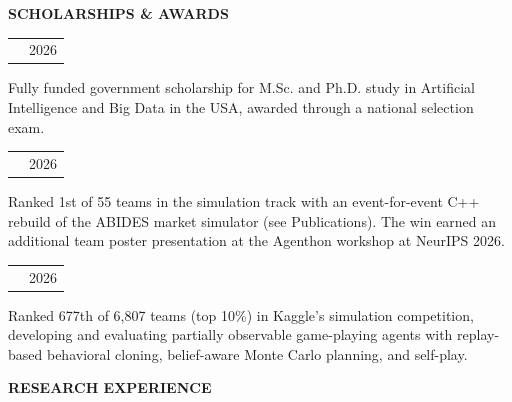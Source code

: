 \documentclass[11pt,a4paper]{article}
\makeatletter
\newcommand{\cvul}{\bgroup\markoverwith{\textcolor{muted!45}{\rule[-0.45ex]{2pt}{0.35pt}}}\ULon}
\newcommand{\hlink}[2]{\href{#1}{\cvul{#2}}}
\newcommand{\cvsection}[3][5]{%
  \par\Needspace*{#1\baselineskip}\vspace{6pt}%
  {\bfseries\fontsize{11}{13}\selectfont #3}\par\nobreak
  \vspace{3pt}{\color{muted}\hrule height 0.4pt}\nobreak\vspace{6pt}%
}
\newcommand{\cvheading}[2]{%
  \begin{tabularx}{\linewidth}{@{}>{\raggedright\arraybackslash}X@{\hspace{10pt}}r@{}}%
  \textbf{#1} & {\small\color{muted}#2}\\
  \end{tabularx}\par\nobreak
}
\newcommand{\cvbody}[1]{{\small\raggedright #1\par}}
\makeatother
\begin{document}
\cvsection{}{SCHOLARSHIPS \& AWARDS}
\begin{minipage}{\linewidth}\raggedright
\cvheading{\small{}1416 YLSY Scholarship · \hlink{https://rusen.ai/Sponsorship-MSc-PhD.pdf}{M.Sc. \& Ph.D.}}{2026}\vspace{2pt}
\cvbody{Fully funded government scholarship for M.Sc. and Ph.D. study in Artificial Intelligence and Big Data in the USA, awarded through a national selection exam.}
\end{minipage}\par\vspace{3pt}
\begin{minipage}{\linewidth}\raggedright
\cvheading{\small{}\hlink{https://www.agenthon.net/}{1st Place · Agenthon 2026, Track 3 (Simulation)}}{2026}\vspace{2pt}
\cvbody{Ranked 1st of 55 teams in the simulation track with an event-for-event C++ rebuild of the ABIDES market simulator (see Publications). The win earned an additional team poster presentation at the Agenthon workshop at NeurIPS 2026.}
\end{minipage}\par\vspace{3pt}
\begin{minipage}{\linewidth}\raggedright
\cvheading{\small{}\hlink{https://www.kaggle.com/certification/competitions/rusenbirben/pokemon-tcg-ai-battle}{Kaggle Bronze Medal · The Pokémon Company PTCG AI Battle Challenge}}{2026}\vspace{2pt}
\cvbody{Ranked 677th of 6,807 teams (top 10\%) in Kaggle’s simulation competition, developing and evaluating partially observable game-playing agents with replay-based behavioral cloning, belief-aware Monte Carlo planning, and self-play.}
\end{minipage}\par\vspace{3pt}
\cvsection{}{RESEARCH EXPERIENCE}
\end{document}
